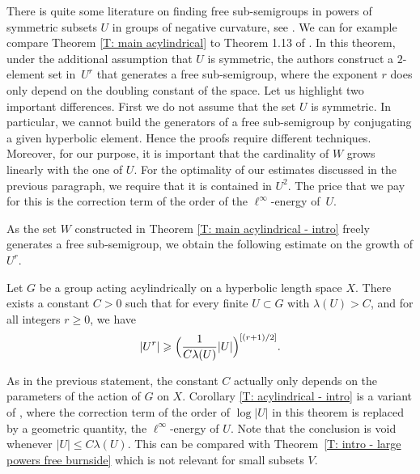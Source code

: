 There is quite some literature on finding free sub-semigroups in powers of symmetric subsets $U$ in groups of negative curvature, see \cite{koubi_croissance_1998,arzhantseva_lower_2006,breuillard_joint_2018}.
We can for example compare Theorem \ref{T: main acylindrical} to Theorem 1.13 of \cite{breuillard_joint_2018}. In this theorem, under the additional assumption that $U$ is symmetric, the authors construct a $2$-element set in~$U^r$ that generates a free sub-semigroup, where the exponent $r$ does only depend on the doubling constant of the space.
Let us highlight two important differences.
First we do not assume that the set $U$ is symmetric.
In particular, we cannot build the generators of a free sub-semigroup by conjugating a given hyperbolic element.
Hence the proofs require different techniques.
Moreover, for our purpose, it is important that the cardinality of $W$ grows linearly with the one of $U$. For the optimality of our estimates discussed in the previous paragraph, we require that it is contained in $U^2$.
The price that we pay for this is the correction term of the order of the $\ell^{\infty}$-energy of~$U$.

As the set $W$ constructed in Theorem \ref{T: main acylindrical - intro} freely generates a free sub-semigroup, we obtain the following estimate on the growth of $U^r$.

\begin{cor}
\label{T: acylindrical - intro}
Let $G$ be a group acting acylindrically on a hyperbolic length space $X$.
There exists a constant $C > 0$ such that for every finite $U\subset G$ with $\lambda(U)> C$, and for all integers $r\geqslant 0$, we have
\[
|U^r|\geqslant \Bigl(\frac 1{C\lambda(U)} |U| \Bigr)^{[(r+1)/2]} .
\]
\end{cor}

As in the previous statement, the constant $C$ actually only depends on the parameters of the action of $G$ on $X$.
Corollary \ref{T: acylindrical - intro} is a variant of \cite[Th.\,1.14]{delzant_product_2020}, where the correction term of the order of $\log|U|$ in this theorem is replaced by a geometric quantity, the $\ell^{\infty}$-energy of $U$.
Note that the conclusion is void whenever $|U| \leq C \lambda(U)$.
This can be compared with Theorem~\ref{T: intro - large powers free burnside} which is not relevant for small subsets $V$.

